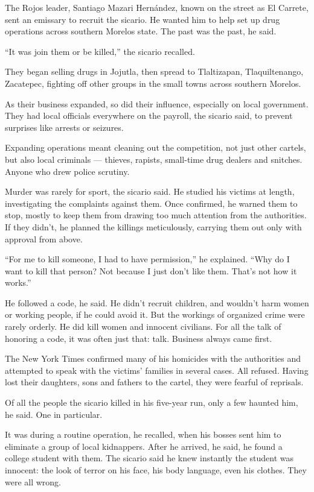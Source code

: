 The Rojos leader, Santiago Mazari Hernández, known on the street as El
Carrete, sent an emissary to recruit the sicario. He wanted him to help
set up drug operations across southern Morelos state. The past was the
past, he said.

``It was join them or be killed,'' the sicario recalled.

They began selling drugs in Jojutla, then spread to Tlaltizapan,
Tlaquiltenango, Zacatepec, fighting off other groups in the small towns
across southern Morelos.

As their business expanded, so did their influence, especially on local
government. They had local officials everywhere on the payroll, the
sicario said, to prevent surprises like arrests or seizures.

Expanding operations meant cleaning out the competition, not just other
cartels, but also local criminals --- thieves, rapists, small-time drug
dealers and snitches. Anyone who drew police scrutiny.

Murder was rarely for sport, the sicario said. He studied his victims at
length, investigating the complaints against them. Once confirmed, he
warned them to stop, mostly to keep them from drawing too much attention
from the authorities. If they didn't, he planned the killings
meticulously, carrying them out only with approval from above.

``For me to kill someone, I had to have permission,'' he explained.
``Why do I want to kill that person? Not because I just don't like them.
That's not how it works.''

He followed a code, he said. He didn't recruit children, and wouldn't
harm women or working people, if he could avoid it. But the workings of
organized crime were rarely orderly. He did kill women and innocent
civilians. For all the talk of honoring a code, it was often just that:
talk. Business always came first.

The New York Times confirmed many of his homicides with the authorities
and attempted to speak with the victims' families in several cases. All
refused. Having lost their daughters, sons and fathers to the cartel,
they were fearful of reprisals.

Of all the people the sicario killed in his five-year run, only a few
haunted him, he said. One in particular.

It was during a routine operation, he recalled, when his bosses sent him
to eliminate a group of local kidnappers. After he arrived, he said, he
found a college student with them. The sicario said he knew instantly
the student was innocent: the look of terror on his face, his body
language, even his clothes. They were all wrong.

